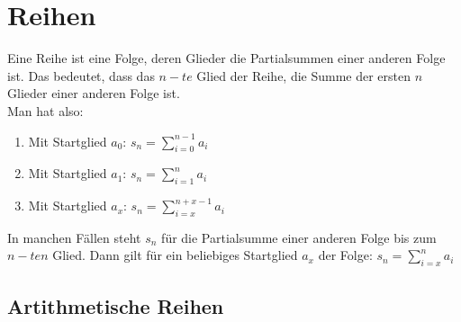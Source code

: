 \chapter{Reihen}

\begin{Definition}
Eine Reihe ist eine Folge, deren Glieder die Partialsummen einer anderen Folge ist. Das bedeutet, dass das $n-te$ Glied der Reihe, die Summe der ersten $n$ Glieder einer anderen Folge ist. \\
Man hat also:

\begin{enumerate} 
\item Mit Startglied $a_{0}$: $s_{n}=\sum\limits_{i=0}^{n-1}a_{i}$
\item Mit Startglied $a_{1}$: $s_{n}=\sum\limits_{i=1}^{n}a_{i}$
\item Mit Startglied $a_{x}$: $s_{n}=\sum\limits_{i=x}^{n+x-1}a_{i}$
\end{enumerate}

\end{Definition}

\begin{Bemerkung}
In manchen Fällen steht $s_{n}$ für die Partialsumme einer anderen Folge bis zum $n-ten$ Glied.
Dann gilt für ein beliebiges Startglied $a_{x}$ der Folge: $s_{n}=\sum\limits_{i=x}^{n}a_{i}$
\end{Bemerkung}

		\section{Artithmetische Reihen}


